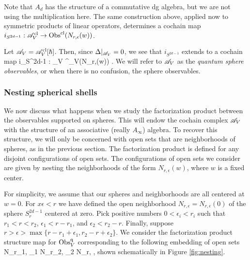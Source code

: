 \documentclass[10pt]{amsart}
\begin{document}
Note that $A_d$ has the structure of a commutative dg algebra, but we are not using the multiplication here.
The same construction above, applied now to symmetric products of linear operators, determines a cochain map $i_{S^{2d-1}} : \mathscr A^{{\rm cl}}_{V} \to {\rm Obs}^{{\rm cl}}(N_{r,\epsilon}(w))$.

Let $\mathscr A_{V} = \mathscr A_V^{{\rm cl}}[\hbar]$.
Then, since $\Delta|_{\mathscr A_V} = 0$, we see that $i_{S^{2d-1}}$ extends to a cochain map
\ben
i_{S^{2d-1}} : \sA_{V} \to \Obs^\q_V(N_{r,\epsilon}(w)) .
\een
We will refer to $\mathscr A_V$ as the {\em quantum sphere observables}, or when there is no confusion, the sphere observables. 

\subsubsection{Nesting spherical shells}

We now discuss what happens when we study the factorization product between the observables supported on spheres. 
This will endow the cochain complex $\mathscr A_V$ with the structure of an associative (really $A_\infty$) algebra. 
To recover this structure, we will only be concerned with open sets that are neighborhoods of spheres, as in the previous section. 
The factorization product is defined for any disjoint configurations of open sets. 
The configurations of open sets we consider are given by nesting the neighborhoods of the form $N_{r,\epsilon}(w)$, where $w$ is a fixed center.

For simplicity, we assume that our spheres and neighborhoods are all centered at $w=0$.
For $x\epsilon < r$ we have defined the open neighborhood $N_{r,\epsilon}=N_{r,\epsilon}(0)$ of the sphere $S^{2d-1}_r$ centered at zero.
Pick positive numbers $0 < \epsilon_i < r_i$ such that $r_1 < r < r_2$, $\epsilon_1 < r - r_1$, and $\epsilon_2 < r_2 - r$.
Finally, suppose $r > \epsilon > \max\{r - r_1 + \epsilon_1, r_2 - r + \epsilon_2\}$. 
We consider the factorization product structure map for ${\rm Obs}^{{\rm q}}_{V}$ corresponding to the following embedding of open sets
\be\label{fact product 1}
N_{r_1, \epsilon_1} \sqcup N_{r_2, \epsilon_2} \hookrightarrow N_{r, \epsilon}  ,
\ee
shown schematically in Figure \ref{fig:nesting}. 


%
\end{document}
